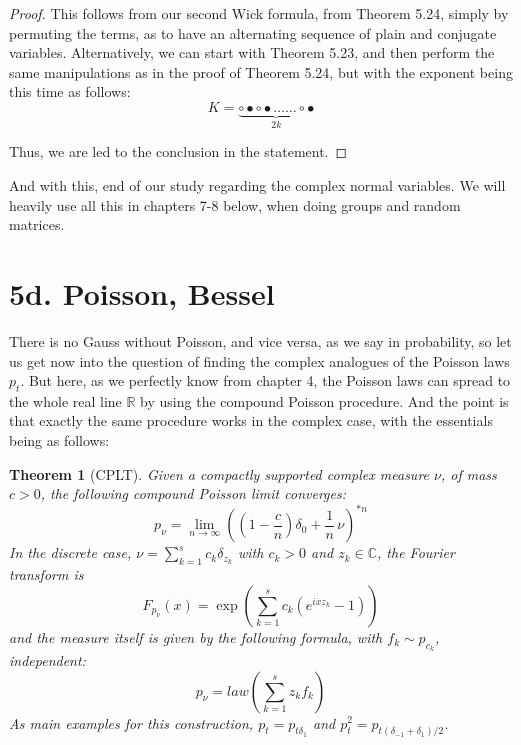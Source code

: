 \documentclass[12pt]{amsbook}
\newtheorem{theorem}{Theorem}[chapter]
\begin{document}
\begin{proof}
This follows from our second Wick formula, from Theorem 5.24, simply by permuting the terms, as to have an alternating sequence of plain and conjugate variables. Alternatively, we can start with Theorem 5.23, and then perform the same manipulations as in the proof of Theorem 5.24, but with the exponent being this time as follows: 
$$K=\underbrace{\circ\bullet\circ\bullet\ldots\ldots\circ\bullet}_{2k}$$

Thus, we are led to the conclusion in the statement.
\end{proof}

And with this, end of our study regarding the complex normal variables. We will heavily use all this in chapters 7-8 below, when doing groups and random matrices.

\section*{5d. Poisson, Bessel}

There is no Gauss without Poisson, and vice versa, as we say in probability, so let us get now into the question of finding the complex analogues of the Poisson laws $p_t$. But here, as we perfectly know from chapter 4, the Poisson laws can spread to the whole real line $\mathbb R$ by using the compound Poisson procedure. And the point is that exactly the same procedure works in the complex case, with the essentials being as follows:


\begin{theorem}[CPLT]
Given a compactly supported complex measure $\nu$, of mass $c>0$, the following compound Poisson limit converges:
$$p_\nu=\lim_{n\to\infty}\left(\left(1-\frac{c}{n}\right)\delta_0+\frac{1}{n}\,\nu\right)^{*n}$$
In the discrete case, $\nu=\sum_{k=1}^sc_k\delta_{z_k}$ with $c_k>0$ and $z_k\in\mathbb C$, the Fourier transform is
$$F_{p_\nu}(x)=\exp\left(\sum_{k=1}^sc_k(e^{ixz_k}-1)\right)$$
and the measure itself is given by the following formula, with $f_k\sim p_{c_k}$, independent:
$$p_\nu=law\left(\sum_{k=1}^sz_kf_k\right)$$
As main examples for this construction, $p_t=p_{t\delta_1}$ and $p_t^2=p_{t(\delta_{-1}+\delta_1)/2}$.
\end{theorem}
\end{document}
